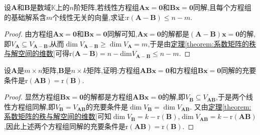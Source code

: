 \documentclass[lang=cn,newtx,10pt,scheme=chinese]{elegantbook}
\begin{document}
\begin{example}
设\(\boldsymbol{A}\)和\(\boldsymbol{B}\)是数域\(\mathbb{K}\)上的\(n\)阶矩阵,若线性方程组\(\boldsymbol{A}\boldsymbol{x}=\boldsymbol{0}\)和\(\boldsymbol{B}\boldsymbol{x}=\boldsymbol{0}\)同解,且每个方程组的基础解系含\(m\)个线性无关的向量,求证:\(\mathrm{r}(\boldsymbol{A}-\boldsymbol{B})\leq n - m\).
\end{example}
\begin{proof}
由方程组\(\boldsymbol{A}\boldsymbol{x}=\boldsymbol{0}\)和\(\boldsymbol{B}\boldsymbol{x}=\boldsymbol{0}\)同解可知,\(\boldsymbol{A}\boldsymbol{x}=\boldsymbol{0}\)的解都是\((\boldsymbol{A}-\boldsymbol{B})\boldsymbol{x}=\boldsymbol{0}\)的解,即\(V_{\boldsymbol{A}}\subseteq V_{\boldsymbol{A}-\boldsymbol{B}}\),从而\(\dim V_{\boldsymbol{A}-\boldsymbol{B}}\geq\dim V_{\boldsymbol{A}} = m\),于是由\hyperref[theorem:系数矩阵的秩与解空间的维数]{定理\ref{theorem:系数矩阵的秩与解空间的维数}}可得$\mathrm{r(}\boldsymbol{A}-\boldsymbol{B})=n-\mathrm{dim}V_{\boldsymbol{A}-\boldsymbol{B}}\le n-m$.
\end{proof}

\begin{proposition}\label{proposition:ABx=O与Bx=O同解的充要条件}
设\(\boldsymbol{A}\)是\(m\times n\)矩阵,\(\boldsymbol{B}\)是\(n\times k\)矩阵,证明:方程组\(\boldsymbol{A}\boldsymbol{B}\boldsymbol{x}=\boldsymbol{0}\)和方程组\(\boldsymbol{B}\boldsymbol{x}=\boldsymbol{0}\)同解的充要条件是\(\mathrm{r}(\boldsymbol{A}\boldsymbol{B})=\mathrm{r}(\boldsymbol{B})\).
\end{proposition}
\begin{proof}
显然方程组\(\boldsymbol{B}\boldsymbol{x}=\boldsymbol{0}\)的解都是方程组\(\boldsymbol{A}\boldsymbol{B}\boldsymbol{x}=\boldsymbol{0}\)的解,即\(V_{\boldsymbol{B}}\subseteq V_{\boldsymbol{A}\boldsymbol{B}}\),于是两个线性方程组同解,即\(V_{\boldsymbol{B}} = V_{\boldsymbol{A}\boldsymbol{B}}\)的充要条件是\(\dim V_{\boldsymbol{B}}=\dim V_{\boldsymbol{A}\boldsymbol{B}}\). 又由\hyperref[theorem:系数矩阵的秩与解空间的维数]{定理\ref{theorem:系数矩阵的秩与解空间的维数}}可知\(\dim V_{\boldsymbol{B}}=k - \mathrm{r}(\boldsymbol{B})\),\(\dim V_{\boldsymbol{A}\boldsymbol{B}}=k - \mathrm{r}(\boldsymbol{A}\boldsymbol{B})\),因此上述两个方程组同解的充要条件是\(\mathrm{r}(\boldsymbol{A}\boldsymbol{B})=\mathrm{r}(\boldsymbol{B})\). 
\end{proof}
\end{document}
